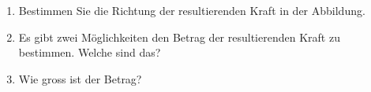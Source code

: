 
\begin{aufgabe}
	\begin{enumerate}
		\item Bestimmen Sie die Richtung der resultierenden Kraft in der Abbildung.
		\item Es gibt zwei Möglichkeiten den Betrag der resultierenden Kraft zu bestimmen. Welche sind das?
		\item Wie gross ist der Betrag?
	\end{enumerate}
\end{aufgabe}
